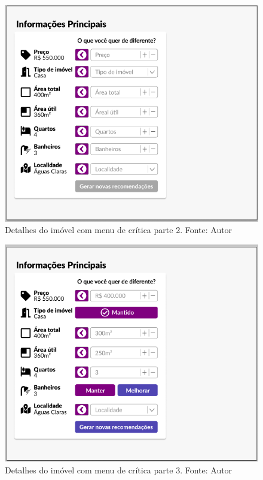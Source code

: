 \begin{figure}[H]
    \centering
    \includegraphics[scale=0.8]{figuras/proposta/prototipo_critico2.png}
    \caption[Detalhes do imóvel com menu de crítica parte 2]{Detalhes do imóvel com menu de crítica parte 2. Fonte: Autor}
    \label{fig:prototipo_critico2}
\end{figure}

\begin{figure}[H]
    \centering
    \includegraphics[scale=0.8]{figuras/proposta/prototipo_critico3.png}
    \caption[Detalhes do imóvel com menu de crítica parte 3]{Detalhes do imóvel com menu de crítica parte 3. Fonte: Autor}
    \label{fig:prototipo_critico3}
\end{figure}

